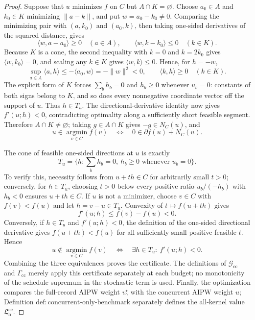 \documentclass{article}
\begin{document}
\begin{proof}
Suppose that \(u\) minimizes \(f\) on \(C\) but \(A\cap K=\varnothing\).  Choose \(a_0\in A\) and \(k_0\in K\) minimizing \(\|a-k\|\), and put \(w=a_0-k_0\ne0\).  Comparing the minimizing pair with \((a,k_0)\) and \((a_0,k)\), then taking one-sided derivatives of the squared distance, gives
\[
\langle w,a-a_0\rangle\ge0\quad(a\in A),
\qquad
\langle w,k-k_0\rangle\le0\quad(k\in K).
\]
Because \(K\) is a cone, the second inequality with \(k=0\) and \(k=2k_0\) gives \(\langle w,k_0\rangle=0\), and scaling any \(k\in K\) gives \(\langle w,k\rangle\le0\).  Hence, for \(h=-w\),
\[
\sup_{a\in A}\langle a,h\rangle
\le-\langle a_0,w\rangle
=-\|w\|^2<0,
\qquad
\langle k,h\rangle\ge0\quad(k\in K).
\]
The explicit form of \(K\) forces \(\sum_bh_b=0\) and \(h_b\ge0\) whenever \(u_b=0\): constants of both signs belong to \(K\), and so does every nonnegative coordinate vector off the support of \(u\).  Thus \(h\in T_u\).  The directional-derivative identity now gives \(f'(u;h)<0\), contradicting optimality along a sufficiently short feasible segment.  Therefore \(A\cap K\ne\varnothing\); taking \(g\in A\cap K\) gives \(-g\in N_C(u)\), and
\[
u\in\operatorname*{argmin}_{v\in C}f(v)
\quad\Longleftrightarrow\quad
0\in\partial f(u)+N_C(u).
\]

The cone of feasible one-sided directions at \(u\) is exactly
\[
T_u=\{h:\sum_bh_b=0,\ h_b\ge0\text{ whenever }u_b=0\}.
\]
To verify this, necessity follows from \(u+th\in C\) for arbitrarily small \(t>0\); conversely, for \(h\in T_u\), choosing
\(t>0\) below every positive ratio \(u_b/(-h_b)\) with \(h_b<0\) ensures \(u+th\in C\).  If \(u\) is not a minimizer, choose \(v\in C\) with \(f(v)<f(u)\) and let \(h=v-u\in T_u\).  Convexity of \(t\mapsto f(u+th)\) gives
\[
f'(u;h)\le f(v)-f(u)<0.
\]
Conversely, if \(h\in T_u\) and \(f'(u;h)<0\), the definition of the one-sided directional derivative gives \(f(u+th)<f(u)\) for all sufficiently small positive feasible \(t\).  Hence
\[
u\notin\operatorname*{argmin}_{v\in C}f(v)
\quad\Longleftrightarrow\quad
\exists h\in T_u:\ f'(u;h)<0.
\]
Combining the three equivalences proves the certificate.  The definitions of \(\mathcal G_{\mathrm{cc}}\) and \(\Gamma_{\mathrm{cc}}\) merely apply this certificate separately at each budget; no monotonicity of the schedule supremum in the stochastic term is used.  Finally, the optimization compares the full-record AIPW weight \(v_\gamma^\star\) with the concurrent AIPW weight \(u\); Definition \(\mathrm{def:concurrent\text{-}only\text{-}benchmark}\) separately defines the all-kernel value \(\mathfrak L_\alpha^{\mathrm{cc}}\).
\end{proof}
\end{document}

